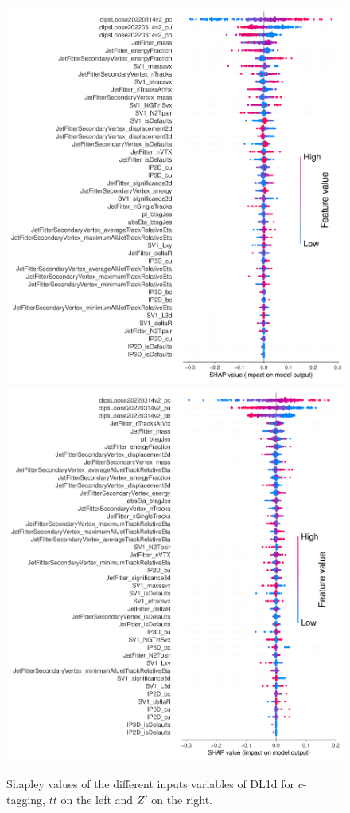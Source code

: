 \begin{figure}
  \centering
  \includegraphics[scale=0.7]{Images/FTAG/DL1d/Shap/ttc.png}
  \includegraphics[scale=0.7]{Images/FTAG/DL1d/Shap/zpc.png}
  \caption{Shapley values of the different inputs variables of DL1d for $c$-tagging, $t\bar{t}$ on the left and $Z'$ on the right.} 
  \label{fig:DL1dshapc}
\end{figure} 

